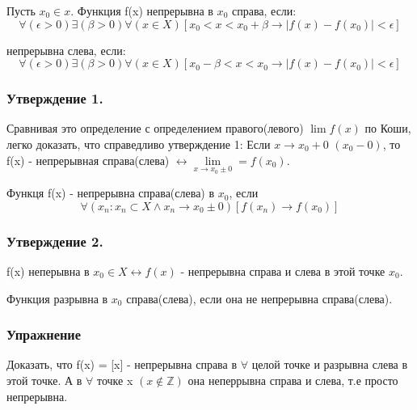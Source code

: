 \opred
	Пусть $x_0 \in x$. Функция f(x) непрерывна в $x_0$ справа, если: $$\forall(\epsilon>0)\exists(\beta>0)\forall(x \in X)[x_0 < x < x_0+\beta\rightarrow |f(x)-f(x_0)| < \epsilon]$$

	непрерывна слева, если:  $$\forall(\epsilon>0)\exists(\beta>0)\forall(x \in X)[x_0 - \beta < x < x_0\rightarrow |f(x)-f(x_0)| < \epsilon]$$

\subsubsection{Утверждение 1.}
	Сравнивая это определение с определением правого(левого) $\lim f(x)$ по Коши, легко доказать, что справедливо утверждение 1:
	Если $x\rightarrow x_0 + 0$ $(x_0-0)$, то f(x) - непрерывная справа(слева) $\leftrightarrow\lim\limits_{x\rightarrow x_0\pm0}=f(x_0)$.

\opred
	Функця f(x) - непрерывна справа(слева) в $x_0$, если $$\forall({x_n}:x_n\subset X\wedge x_n \rightarrow x_0 \pm0 )[f(x_n)\rightarrow f(x_0)]$$

\subsubsection{Утверждение 2.}f(x) неперывна в $x_0 \in X \leftrightarrow f(x)$ - непрерывна справа и слева в этой точке $x_0$.

\opred
	Функция разрывна в $x_0$ справа(слева), если она не непрерывна справа(слева).

\subsubsection{Упражнение} Доказать, что f(x) = [x] - непрерывна справа в $\forall$ целой точке и разрывна слева в этой точке. А в $\forall$ точке x $(x\notin \mathbb {Z})$ она неперрывна справа и слева, т.е просто непрерывна.
